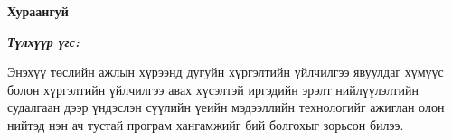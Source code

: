 

\begin{center}
{\scshape\Large \univname\par} %
{\scshape\large \facname\par}\vspace{0.5cm} %
{\huge\textbf{{Хураангуй}} \par}
\bigskip
{\Large{\ttitle} \par} %
\bigskip

{\normalsize \shortname \par} %
\addressname
\end{center}

\textit{\textbf{Түлхүүр үгс: \keywordnames}}
\bigskip

Энэхүү төслийн ажлын хүрээнд дугуйн хүргэлтийн үйлчилгээ явуулдаг хүмүүс болон хүргэлтийн үйлчилгээ авах хүсэлтэй иргэдийн эрэлт нийлүүлэлтийн судалгаан дээр үндэслэн сүүлийн үеийн мэдээллийн технологийг ажиглан олон нийтэд нэн ач тустай програм хангамжийг бий болгохыг зорьсон билээ.